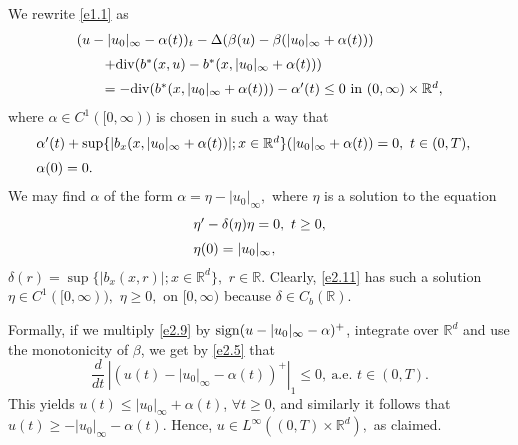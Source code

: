 \documentclass[12pt]{article}
\def\rrd{{\rr^d}}
\def\vsp{\vspace*{1,5mm}\\ }
\def\n{\noindent }
\def\D{{\Delta}}
\def\barr{\begin{array}}
\def\earr{\end{array}}
\def\D{{\Delta}}
\theoremstyle{definition}
\def\vsp{\vspace*{2mm}\\ }
\def\rr{{\mathbb{R}}}
\def\9{{\infty}}
\def\a{{\alpha}}
\def\b{{\beta}}
\def\D{{\Delta}}
\def\barr{\begin{array}}
\def\earr{\end{array}}
\def\n{\noindent }
\def\vsp{\vspace*{2mm}\\ }
\def\ff{\forall }
\begin{document}
\n{\bf Proof.} We rewrite \eqref{e1.1} as
\begin{equation}
 \label{e2.9}
\barr{l}
(u-|u_0|_\9-\alpha(t))_t-\D(\b(u)-\b(|u_0|_\9+\a(t)))\vsp \qquad
+{\rm div}(b^*(x,u)-b^*(x,|u_0|_\9+\a(t)))\vsp 
\qquad=-{\rm div}(b^*(x,|u_0|_\9+\a(t)))-\a'(t)\le0\mbox{ in }(0,\9)\times\rrd,
\earr
\end{equation}where $\a\in C^1([0,\9))$ is chosen in such a way that
\begin{equation}
\label{e2.10}
\hspace*{-3mm}\barr{l}
\a'(t)+\sup\{|b_x(x,|u_0|_\9+\a(t))|;x\in\rrd\}(|u_0|_\9+\a(t))=0,\   t\in(0,T),\vsp 
\a(0)=0.\earr
\end{equation}
We may find $\a$ of the form $\a=\eta-|u_0|_\9,$ where $\eta$ is a solution to the equation 
\begin{equation}
\label{e2.11}
\barr{l}
\eta'-\delta(\eta)\eta  =0,\ t\ge0,\vsp 
\eta(0)=|u_0|_\9,\earr
\end{equation} $\delta(r)=\sup\{|b_x(x,r)|;x\in\rrd\},$ $r\in\rr.$ Clearly, \eqref{e2.11} has such a solution    $\eta\in C^1([0,\9)),$ $\eta\ge0,$ on $[0,\9)$ because $\delta\in C_b(\rr).$ 


Formally, if we multiply \eqref{e2.9} by ${\rm sign}(u-|u_0|_\9-\a)^+$,   integrate over $\rrd$  and use the monotonicity of $\b$, we get by \eqref{e2.5} that  
\begin{equation}\label{e2.11a}
	\frac d{dt}\,|(u(t)-|u_0|_\9-\a(t))^+|_1\le0,\ \mbox{a.e. }t\in(0,T). \end{equation}This yields $u(t)\le|u_0|_\9+\a(t)$, $\ff t\ge0$, and similarly it follows that $u(t)\ge-|u_0|_\9-\a(t).$ Hence, $u\in L^\9((0,T)\times\rrd),$ as claimed.
\end{document}
